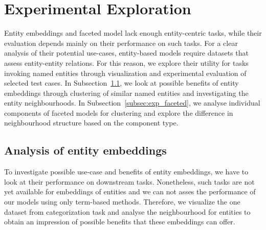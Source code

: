 \section{Experimental Exploration}\label{sec:eval_experimental}
Entity embeddings and faceted model lack enough entity-centric tasks, while their evaluation depends mainly on their performance on such tasks. For a clear analysis of their potential use-cases, entity-based models require datasets that assess entity-entity relations. For this reason, we explore their utility for tasks invoking named entities through visualization and experimental evaluation of selected test cases. In Subsection~\ref{subsec:exp_entity}, we look at possible benefits of entity embeddings through clustering of similar named entities and investigating the entity neighbourhoods. In Subsection~\ref{subsec:exp_faceted}, we analyse individual components of faceted models for clustering and explore the difference in neighbourhood structure based on the component type.
\subsection{Analysis of entity embeddings}\label{subsec:exp_entity}
To investigate possible use-case and benefits of entity embeddings, we have to look at their performance on downstream tasks. Nonetheless, such tasks are not yet available for embeddings of entities and we can not asses the performance of our models using only term-based methods. Therefore, we visualize the one dataset from categorization task and analyse the neighbourhood for entities to obtain an impression of possible benefits that these embeddings can offer. 
